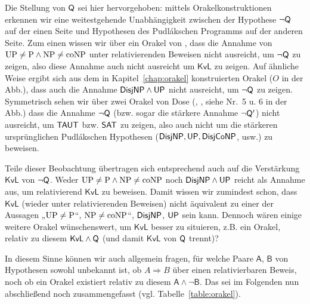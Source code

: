 Die Stellung von $\mathsf{Q}$ sei hier hervorgehoben: mittels Orakelkonstruktionen erkennen wir eine weitestgehende Unabhängigkeit zwischen der Hypothese $\neg\mathsf{Q}$ auf der einen Seite und Hypothesen des Pudlákschen Programms auf der anderen Seite. Zum einen wissen wir über ein Orakel von \textcite[Thm.~12.3, Nr.~8 in der Abb.]{fenner_inverting_2003}, dass die Annahme von $\mathrm{UP}\neq\mathrm{P}\land \mathrm{NP}\neq\mathrm{coNP}$ unter relativierenden Beweisen nicht ausreicht, um $\neg\mathsf{Q}$ zu zeigen, also diese Annahme auch nicht ausreicht um $\mathsf{KvL}$ zu zeigen.
Auf ähnliche Weise ergibt sich aus dem in Kapitel~\ref{chap:orakel} konstruierten Orakel ($O$ in der Abb.), dass auch die Annahme $\mathsf{DisjNP}\land\mathsf{UP}$ nicht ausreicht, um $\neg\mathsf{Q}$ zu zeigen.
Symmetrisch sehen wir über zwei Orakel von Dose (\cite*[Cor.~3.3]{dose_oracle_2020}, \cite*[Thm.~3.2]{dose_further_2020}, siehe Nr.~5 u. 6 in der Abb.) dass die Annahme $\neg\mathsf{Q}$ (bzw. sogar die stärkere Annahme $\neg\mathsf{Q}'$) nicht ausreicht, um $\mathsf{TAUT}$ bzw. $\mathsf{SAT}$ zu zeigen, also auch nicht um die stärkeren ursprünglichen Pudlákschen Hypothesen ($\mathsf{DisjNP}, \mathsf{UP}, \mathsf{DisjCoNP}$, usw.) zu beweisen.



Teile dieser Beobachtung übertragen sich entsprechend auch auf die Verstärkung $\mathsf{KvL}$ von $\neg\mathsf{Q}$. Weder $\mathrm{UP}\neq\mathrm{P}\land \mathrm{NP}\neq\mathrm{coNP}$ noch $\mathsf{DisjNP}\land\mathsf{UP}$ reicht als Annahme aus, um relativierend $\mathsf{KvL}$ zu beweisen.
Damit wissen wir zumindest schon, dass $\mathsf{KvL}$ (wieder unter relativierenden Beweisen) nicht äquivalent zu einer der Aussagen „$\mathrm{UP}\neq \mathrm{P}$“, $\mathrm{NP}\neq\mathrm{coNP}$“, $\mathsf{DisjNP}$, $\mathsf{UP}$ sein kann. 
Dennoch wären einige weitere Orakel wünschenswert, um $\mathsf{KvL}$ besser zu situieren, z.B. ein Orakel, relativ zu diesem $\mathsf{KvL}\land \mathsf{Q}$ (und damit $\mathsf{KvL}$ von $\mathsf{Q}$ trennt)? 

In diesem Sinne können wir auch allgemein fragen, für welche Paare $\mathsf{A}$, $\mathsf{B}$ von Hypothesen sowohl unbekannt ist, ob $A\Rightarrow B$ über einen relativierbaren Beweis, noch ob ein Orakel existiert relativ zu diesem $\mathsf{A\land \neg B}$.
Das sei im Folgenden nun abschließend noch zusammengefasst (vgl. Tabelle~\ref{table:orakel}).

